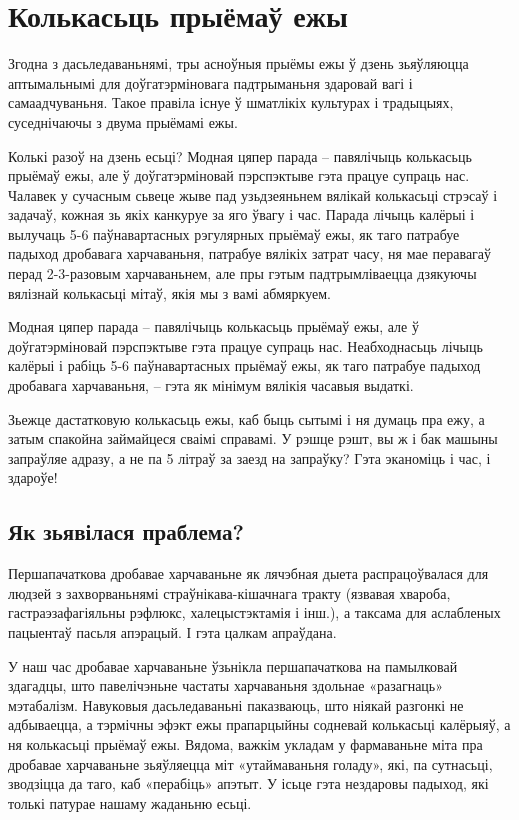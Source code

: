 \chapter{Колькасьць прыёмаў ежы}

Згодна з дасьледаваньнямі, тры асноўныя прыёмы ежы ў дзень зьяўляюцца аптымальнымі для доўгатэрміновага падтрыманьня здаровай вагі і самаадчуваньня. Такое правіла існуе ў шматлікіх культурах і традыцыях, суседнічаючы з двума прыёмамі ежы.

Колькі разоў на дзень есьці? Модная цяпер парада – павялічыць колькасьць прыёмаў ежы, але ў доўгатэрміновай пэрспэктыве гэта працуе супраць нас. Чалавек у сучасным сьвеце жыве пад узьдзеяньнем вялікай колькасьці стрэсаў і задачаў, кожная зь якіх канкуруе за яго ўвагу і час. Парада лічыць калёрыі і вылучаць 5-6 паўнавартасных рэгулярных прыёмаў ежы, як таго патрабуе падыход дробавага харчаваньня, патрабуе вялікіх затрат часу, ня мае перавагаў перад 2-3-разовым харчаваньнем, але пры гэтым падтрымліваецца дзякуючы вялізнай колькасьці мітаў, якія мы з вамі абмяркуем.

Модная цяпер парада – павялічыць колькасьць прыёмаў ежы, але ў доўгатэрміновай пэрспэктыве гэта працуе супраць нас. Неабходнасьць лічыць калёрыі і рабіць 5-6 паўнавартасных прыёмаў ежы, як таго патрабуе падыход дробавага харчаваньня, – гэта як мінімум вялікія часавыя выдаткі.

Зьежце дастатковую колькасьць ежы, каб быць сытымі і ня думаць пра ежу, а затым спакойна займайцеся сваімі справамі. У рэшце рэшт, вы ж і бак машыны запраўляе адразу, а не па 5 літраў за заезд на запраўку? Гэта эканоміць і час, і здароўе!

\section{Як зьявілася праблема?}

Першапачаткова дробавае харчаваньне як лячэбная дыета распрацоўвалася для людзей з захворваньнямі страўнікава-кішачнага тракту (язвавая хвароба, гастраэзафагіяльны рэфлюкс, халецыстэктамія і інш.), а таксама для аслабленых пацыентаў пасьля апэрацый. І гэта цалкам апраўдана.

У наш час дробавае харчаваньне ўзьнікла першапачаткова на памылковай здагадцы, што павелічэньне частаты харчаваньня здольнае «разагнаць» мэтабалізм. Навуковыя дасьледаваньні паказваюць, што ніякай разгонкі не адбываецца, а тэрмічны эфэкт ежы прапарцыйны содневай колькасьці калёрыяў, а ня колькасьці прыёмаў ежы. Вядома, важкім укладам у фармаваньне міта пра дробавае харчаваньне зьяўляецца міт «утаймаваньня голаду», які, па сутнасьці, зводзіцца да таго, каб «перабіць» апэтыт. У ісьце гэта нездаровы падыход, які толькі патурае нашаму жаданьню есьці.

